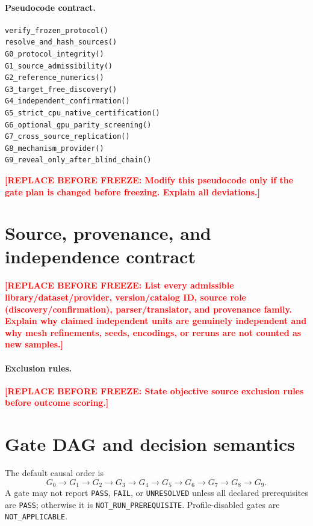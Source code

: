 \documentclass[11pt,a4paper]{article}
\newcommand{\SSTTODO}[1]{\ifmmode\text{\color{red}\bfseries TODO}\else\textcolor{red}{\textbf{[REPLACE BEFORE FREEZE: #1]}}\fi}
\begin{document}
\paragraph{Pseudocode contract.}
\begin{verbatim}
verify_frozen_protocol()
resolve_and_hash_sources()
G0_protocol_integrity()
G1_source_admissibility()
G2_reference_numerics()
G3_target_free_discovery()
G4_independent_confirmation()
G5_strict_cpu_native_certification()
G6_optional_gpu_parity_screening()
G7_cross_source_replication()
G8_mechanism_provider()
G9_reveal_only_after_blind_chain()
\end{verbatim}
\SSTTODO{Modify this pseudocode only if the gate plan is changed before freezing. Explain all deviations.}

\section{Source, provenance, and independence contract}
\SSTTODO{List every admissible library/dataset/provider, version/catalog ID, source role (discovery/confirmation), parser/translator, and provenance family. Explain why claimed independent units are genuinely independent and why mesh refinements, seeds, encodings, or reruns are not counted as new samples.}

\paragraph{Exclusion rules.}
\SSTTODO{State objective source exclusion rules before outcome scoring.}

\section{Gate DAG and decision semantics}
The default causal order is
\begin{equation}
G_0\rightarrow G_1\rightarrow G_2\rightarrow G_3\rightarrow G_4\rightarrow G_5\rightarrow G_6\rightarrow G_7\rightarrow G_8\rightarrow G_9.
\end{equation}
A gate may not report \texttt{PASS}, \texttt{FAIL}, or \texttt{UNRESOLVED} unless all declared prerequisites are \texttt{PASS}; otherwise it is \texttt{NOT\_RUN\_PREREQUISITE}. Profile-disabled gates are \texttt{NOT\_APPLICABLE}.
\end{document}
